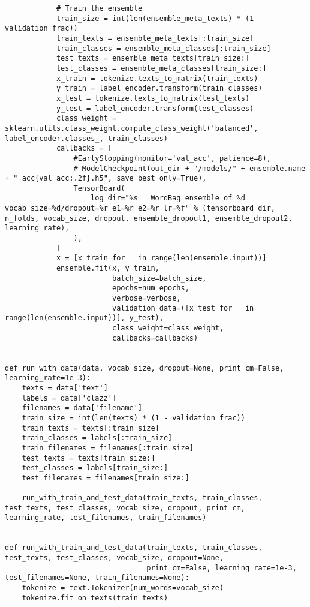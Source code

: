 \begin{verbatim}
            # Train the ensemble
            train_size = int(len(ensemble_meta_texts) * (1 - validation_frac))
            train_texts = ensemble_meta_texts[:train_size]
            train_classes = ensemble_meta_classes[:train_size]
            test_texts = ensemble_meta_texts[train_size:]
            test_classes = ensemble_meta_classes[train_size:]
            x_train = tokenize.texts_to_matrix(train_texts)
            y_train = label_encoder.transform(train_classes)
            x_test = tokenize.texts_to_matrix(test_texts)
            y_test = label_encoder.transform(test_classes)
            class_weight = sklearn.utils.class_weight.compute_class_weight('balanced', label_encoder.classes_, train_classes)
            callbacks = [
                #EarlyStopping(monitor='val_acc', patience=8),
                # ModelCheckpoint(out_dir + "/models/" + ensemble.name + "_acc{val_acc:.2f}.h5", save_best_only=True),
                TensorBoard(
                    log_dir="%s___WordBag ensemble of %d vocab_size=%d/dropout=%r e1=%r e2=%r lr=%f" % (tensorboard_dir, n_folds, vocab_size, dropout, ensemble_dropout1, ensemble_dropout2, learning_rate),
                ),
            ]
            x = [x_train for _ in range(len(ensemble.input))]
            ensemble.fit(x, y_train,
                         batch_size=batch_size,
                         epochs=num_epochs,
                         verbose=verbose,
                         validation_data=([x_test for _ in range(len(ensemble.input))], y_test),
                         class_weight=class_weight,
                         callbacks=callbacks)


def run_with_data(data, vocab_size, dropout=None, print_cm=False, learning_rate=1e-3):
    texts = data['text']
    labels = data['clazz']
    filenames = data['filename']
    train_size = int(len(texts) * (1 - validation_frac))
    train_texts = texts[:train_size]
    train_classes = labels[:train_size]
    train_filenames = filenames[:train_size]
    test_texts = texts[train_size:]
    test_classes = labels[train_size:]
    test_filenames = filenames[train_size:]

    run_with_train_and_test_data(train_texts, train_classes, test_texts, test_classes, vocab_size, dropout, print_cm, learning_rate, test_filenames, train_filenames)


def run_with_train_and_test_data(train_texts, train_classes, test_texts, test_classes, vocab_size, dropout=None,
                                 print_cm=False, learning_rate=1e-3, test_filenames=None, train_filenames=None):
    tokenize = text.Tokenizer(num_words=vocab_size)
    tokenize.fit_on_texts(train_texts)


\end{verbatim}
